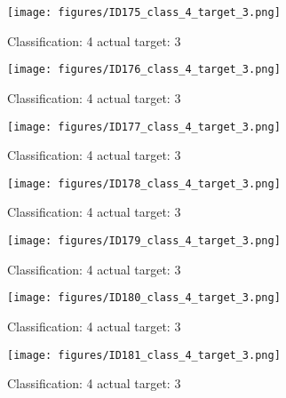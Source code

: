 \begin{figure}[h!]
\begin{center}
\texttt{[image: figures/ID175\_class\_4\_target\_3.png]}
\end{center}
\caption{ Classification: 4 actual target: 3}
\label{fig:ID175_class_4_target_3}
\end{figure}
\begin{figure}[h!]
\begin{center}
\texttt{[image: figures/ID176\_class\_4\_target\_3.png]}
\end{center}
\caption{ Classification: 4 actual target: 3}
\label{fig:ID176_class_4_target_3}
\end{figure}
\begin{figure}[h!]
\begin{center}
\texttt{[image: figures/ID177\_class\_4\_target\_3.png]}
\end{center}
\caption{ Classification: 4 actual target: 3}
\label{fig:ID177_class_4_target_3}
\end{figure}
\begin{figure}[h!]
\begin{center}
\texttt{[image: figures/ID178\_class\_4\_target\_3.png]}
\end{center}
\caption{ Classification: 4 actual target: 3}
\label{fig:ID178_class_4_target_3}
\end{figure}
\begin{figure}[h!]
\begin{center}
\texttt{[image: figures/ID179\_class\_4\_target\_3.png]}
\end{center}
\caption{ Classification: 4 actual target: 3}
\label{fig:ID179_class_4_target_3}
\end{figure}
\begin{figure}[h!]
\begin{center}
\texttt{[image: figures/ID180\_class\_4\_target\_3.png]}
\end{center}
\caption{ Classification: 4 actual target: 3}
\label{fig:ID180_class_4_target_3}
\end{figure}
\begin{figure}[h!]
\begin{center}
\texttt{[image: figures/ID181\_class\_4\_target\_3.png]}
\end{center}
\caption{ Classification: 4 actual target: 3}
\label{fig:ID181_class_4_target_3}
\end{figure}
